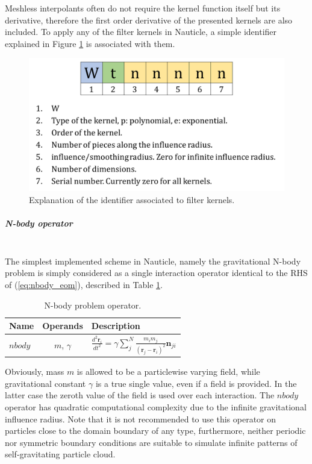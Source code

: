 \documentclass[a4paper,12pt,openany]{book}
\newcommand{\equref}[1]{(\ref{#1})}
\newcommand{\mysubparagraph}[1]{\subparagraph{#1}\mbox{}\\}
\theoremstyle{break}
\begin{document}
Meshless interpolants often do not require the kernel function itself but its derivative, therefore the first order derivative of the presented kernels are also included. To apply any of the filter kernels in Nauticle, a simple identifier explained in Figure \ref{fig:kernel_explanation} is associated with them.
\begin{figure}[H]
  \includegraphics[scale=0.3]{kernel_explanation.pdf}
  \centering
  \caption{Explanation of the identifier associated to filter kernels.}
  \label{fig:kernel_explanation}
\end{figure}

\mysubparagraph{N-body operator}
The simplest implemented scheme in Nauticle, namely the gravitational N-body problem is simply considered as a single interaction operator identical to the RHS of \equref{eq:nbody_eom}, described in Table \ref{tbl:nbody_op}.
\begin{table} [hbt!]
\begin{center}
\caption{N-body problem operator.}\label{tbl:nbody_op}
\begin{tabular}{ l c l }
\toprule[1.5pt]
\bf Name & \bf Operands & \bf Description \\ 
\midrule
$nbody$ & $m$, $\gamma$ & $\frac{d^2\textbf{r}_i}{dt^2}=\gamma\sum_j^N{\frac{m_im_j}{(\textbf{r}_j-\textbf{r}_i)^2}\textbf{n}_{ji}}$ \\ 
\bottomrule[1.25pt]
\end{tabular}
\end{center}
\end{table}
Obviously, mass $m$ is allowed to be a particlewise varying field, while gravitational constant $\gamma$ is a true single value, even if a field is provided. In the latter case the zeroth value of the field is used over each interaction. The $nbody$ operator has quadratic computational complexity due to the infinite gravitational influence radius. Note that it is not recommended to use this operator on particles close to the domain boundary of any type, furthermore, neither periodic nor symmetric boundary conditions are suitable to simulate infinite patterns of self-gravitating particle cloud.
\end{document}
